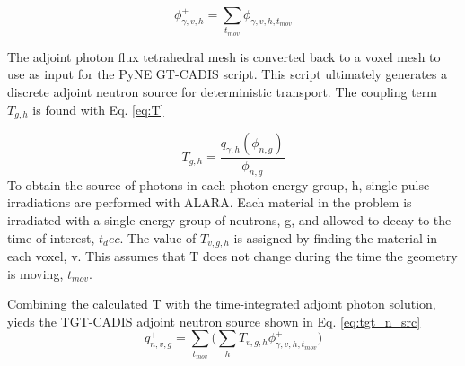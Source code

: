 \begin{equation}\label{eq:sum}
	\phi_{\gamma,v, h}^{+} = \sum_{t_{mov}}{\phi_{\gamma,v,h,t_{mov}}}
\end{equation}

The adjoint photon flux tetrahedral mesh is converted back to a voxel mesh
to use as input for the PyNE GT-CADIS script. This script ultimately generates a
discrete adjoint neutron source for deterministic transport.
The coupling term $T_{g,h}$ is found with Eq.
\ref{eq:T}

\begin{equation}\label{eq:T}
	T_{g,h} = \dfrac{q_{\gamma, h}(\phi_{n,g})}{\phi_{n,g}}
\end{equation}
To obtain the source of photons in each photon energy group, h, 
single pulse irradiations are performed with ALARA.
Each material in the problem is irradiated with a single energy group of
neutrons, g, and allowed to decay to the time of interest, $t_dec$.  The value
of $T_{v,g,h}$ is assigned by finding the material in each voxel, v.
This assumes that T does not change during the time the geometry is
moving, $t_{mov}$.  

Combining the calculated T with the time-integrated adjoint photon solution,
yieds the TGT-CADIS adjoint neutron source shown in Eq.
\ref{eq:tgt_n_src}
\begin{equation}\label{eq:tgt_n_src}
	q_{n,v,g}^{+} =
	\sum_{t_{mov}}\Bigg(\sum_{h} T_{v,g,h} \phi_{\gamma,v,h,t_{mov}}^{+}\Bigg)
\end{equation}



